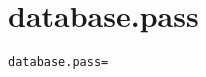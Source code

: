 \section{database.pass}
\label{configuration:DatabasePass}
\ClearAPI
\TODO
{}
\begin{lstlisting}[style=Props,caption={Usage example for \textit{database.pass}}]
database.pass=
\end{lstlisting}